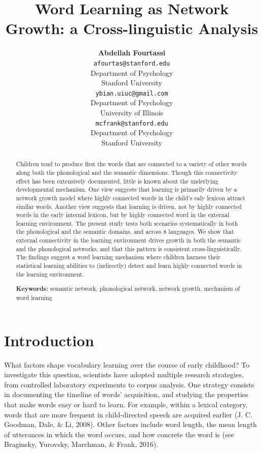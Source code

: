 \documentclass[10pt, letterpaper]{article}
\title{Word Learning as Network Growth: a Cross-linguistic Analysis}
\author{{\large \bf Abdellah Fourtassi} \\ \texttt{afourtas@stanford.edu} \\ Department of Psychology \\ Stanford University \And {\large \bf Yuan Bian} \\ \texttt{ybian.uiuc@gmail.com} \\ Department of Psychology \\ University of Illinois \And {\large \bf Michael C. Frank} \\ \texttt{mcfrank@stanford.edu} \\ Department of Psychology \\ Stanford University}
\begin{document}
\maketitle

\begin{abstract}
Children tend to produce first the words that are connected to a variety
of other words along both the phonological and the semantic dimensions.
Though this connectivity effect has been extensively documented, little
is known about the underlying developmental mechanism. One view suggests
that learning is primarily driven by a network growth model where highly
connected words in the child's ealy lexicon attract similar words.
Another view suggests that learning is driven, not by highly connected
words in the early internal lexicon, but by highly connected word in the
external learning environment. The present study tests both scenarios
systematically in both the phonological and the semantic domains, and
across 8 languages. We show that external connectivity in the learning
environment drives growth in both the semantic and the phonological
networks, and that this pattern is consistent cross-linguistically. The
findings suggest a word learning mechanism where children harness their
statistical learning abilities to (indirectly) detect and learn highly
connected words in the learning environment.

\textbf{Keywords:}
semantic network, phonological network, network growth, mechanism of
word learning
\end{abstract}

\section{Introduction}\label{introduction}

What factors shape vocabulary learning over the course of early
childhood? To investigate this question, scientists have adopted
multiple research strategies, from controlled laboratory experiments to
corpus analysis. One strategy consists in documenting the timeline of
words' acquisition, and studying the properties that make words easy or
hard to learn. For example, within a lexical category, words that are
more frequent in child-directed speech are acquired earlier (J. C.
Goodman, Dale, \& Li, 2008). Other factors include word length, the mean
length of utterances in which the word occurs, and how concrete the word
is (see Braginsky, Yurovsky, Marchman, \& Frank, 2016).
\end{document}
